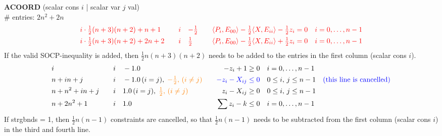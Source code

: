 \documentclass[11pt,a4paper]{article}
\theoremstyle{definition}
\begin{document}
{\noindent
\textbf{ACOORD} (scalar cons $i$ | scalar var $j$ val) \\
\# entries: $2n^2+2n$   \\
\[
  \begin{aligned}
    &{\color{red}i\cdot\tfrac{1}{2}(n+3)(n+2) + n+1} \quad & {\color{red}i} \quad &
    {\color{red}-\tfrac{1}{2}} \quad & {\color{red} \langle P_i, E_{00}
      \rangle - \tfrac{1}{2}\langle X,E_{ii}\rangle - \tfrac{1}{2}z_i = 0}
    \quad &{\color{red} i = 0,\dots,n-1} \\
    &{\color{red}i\cdot\tfrac{1}{2}(n+3)(n+2) + 2n+2} \quad & {\color{red}i} \quad &
    {\color{red}\tfrac{1}{2}} \quad & {\color{red} \langle P_i, E_{00}
      \rangle - \tfrac{1}{2}\langle X,E_{ii}\rangle + \tfrac{1}{2}z_i = 0}
    \quad &{\color{red} i = 0,\dots,n-1} \\
  \end{aligned}
\]
{\color{red} If the valid SOCP-inequality is added, then $\tfrac{1}{2}n(n+3)(n+2)$ needs
  to be added to the entries in the first column (scalar cons $i$).}
\[
  \begin{aligned}
    &i \quad & i \quad & -1.0 \quad & -z_i + 1 \geq 0 \quad & i = 0, \dots,
    n-1 \\
    &n+in+j \quad & i \quad & -1.0\, (i =
    j),\; {\color{orange} -\tfrac{1}{2},\,(i \neq j)} \quad & {\color{blue}-z_i - X_{ij}
    \leq 0} \quad & 0 \leq i,\, j \leq n-1 \quad {\color{blue}
    (\text{this line is cancelled})} \\
    &n+n^2+in+j \quad & i \quad & 1.0\, (i =
    j),\; {\color{orange} \tfrac{1}{2},\,(i \neq j)}\quad & z_i - X_{ij}
    \geq 0 \quad & 0 \leq i,\, j \leq n-1 \\
    &n+2n^2+1 \quad & i \quad & 1.0 \quad & \sum z_i - k \leq 0 \quad &
    i = 0,\dots,n-1 \\
  \end{aligned}
\]
\noindent
{\color{blue} If strgbnds = 1, then $\tfrac{1}{2}n(n-1)$ constraints are
  cancelled, so that $\tfrac{1}{2}n(n-1)$ needs to be subtracted from the
  first column (scalar cons $i$) in the third and fourth line.\\
}

}
\end{document}
